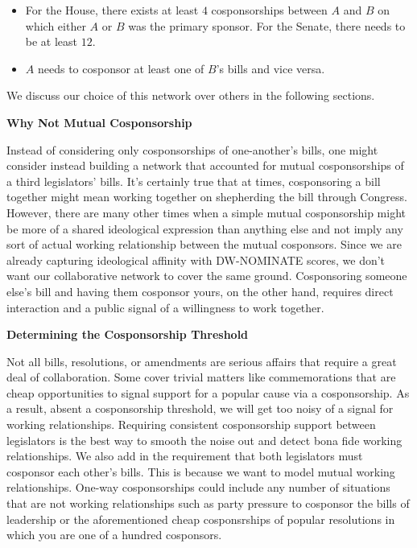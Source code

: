 \begin{itemize}
	\item For the House, there exists at least $4$ cosponsorships between $A$ and $B$ 
	on which either $A$ or $B$ was the primary sponsor. For the Senate, there 
	needs to be at least $12$.
	\item $A$ needs to cosponsor at least one of $B$'s bills and vice versa.
\end{itemize}

We discuss our choice of this network over others in the following sections.

\vspace{3mm}

\noindent
\textbf{Why Not Mutual Cosponsorship}

\vspace{3mm}

Instead of considering only cosponsorships of one-another's bills, one might
consider instead building a network that accounted for mutual cosponsorships of
a third legislators' bills. It's certainly true that at times, cosponsoring a
bill together might mean working together on shepherding the bill through
Congress. However, there are many other times when a simple mutual cosponsorship
might be more of a shared ideological expression than anything else and not
imply any sort of actual working relationship between the mutual cosponsors.
Since we are already capturing ideological affinity with DW-NOMINATE scores, we
don't want our collaborative network to cover the same ground. Cosponsoring
someone else's bill and having them cosponsor yours, on the other hand, requires
direct interaction and a public signal of a willingness to work together.

\vspace{3mm}

\noindent
\textbf{Determining the Cosponsorship Threshold}

\vspace{3mm}

Not all bills, resolutions, or amendments are serious affairs that require a
great deal of collaboration. Some cover trivial matters like commemorations that
are cheap opportunities to signal support for a popular cause via a
cosponsorship. As a result, absent a cosponsorship threshold, we will get too
noisy of a signal for working relationships. Requiring consistent cosponsorship
support between legislators is the best way to smooth the noise out and  detect
bona fide working relationships. We also add in the requirement that both
legislators must cosponsor each other's bills. This is because we want to model
mutual working relationships. One-way cosponsorships could include any number of
situations that are not working relationships such as party pressure to
cosponsor the bills of leadership or the aforementioned cheap cosponsrships of
popular resolutions in which you are one of a hundred cosponsors.

